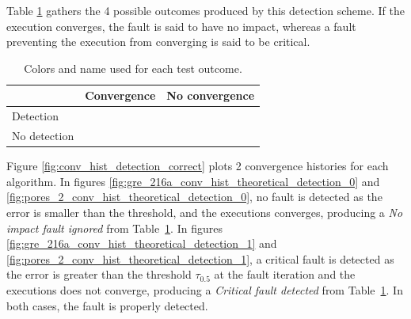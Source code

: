 \documentclass[twoside]{article}
\newcounter{fig}\setcounter{fig}{0}
\begin{document}
  Table \ref{table:theoretical_outcomes} gathers the 4 possible outcomes produced by this detection scheme. If the execution converges, the fault is said to have no impact, whereas a fault preventing the execution from converging is said to be critical. 

  \begin{table}[h]
    \centering
    \caption{Colors and name used for each test outcome.}
    \label{table:theoretical_outcomes}
    \begin{tabular}{l|ll|}
      & Convergence & No convergence\\
      \hline
      Detection & \color[RGB]{30, 30, 30}{\textbf{No impact fault detected}} & \color[RGB]{85, 147, 47}{\textbf{Critical fault detected}} \\
      
      No detection & \color[RGB]{90, 90, 90}{\textbf{No impact fault ignored}} & \color{red}{\textbf{Critical fault ignored}} \\
      \hline
    \end{tabular}
  \end{table}

  Figure \ref{fig:conv_hist_detection_correct} plots 2 convergence histories for each algorithm. In figures \ref{fig:gre_216a_conv_hist_theoretical_detection_0} and 
  \ref{fig:pores_2_conv_hist_theoretical_detection_0}, no fault is detected as the error is smaller than the threshold, and the executions converges, producing a \emph{No impact fault ignored} from Table~\ref{table:theoretical_outcomes}. In figures \ref{fig:gre_216a_conv_hist_theoretical_detection_1} and 
  \ref{fig:pores_2_conv_hist_theoretical_detection_1}, a critical fault is detected as the error is greater than the threshold $\tau_{0.5}$ at the fault iteration and the executions does not converge, producing a \emph{Critical fault detected} from Table~\ref{table:theoretical_outcomes}. In both cases, the fault is properly detected.






  
\end{document}
